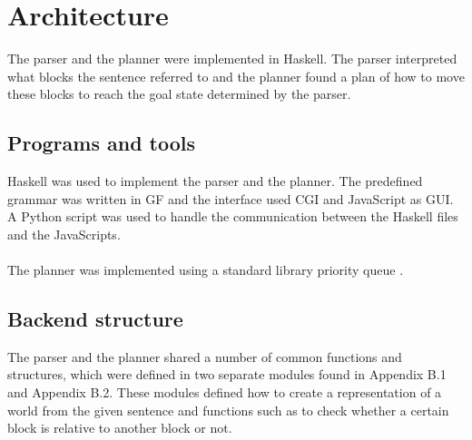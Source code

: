 \chapter{Architecture}
The parser and the planner were implemented in Haskell. The parser interpreted
what blocks the sentence referred to and the planner found a plan of how to
move these blocks to reach the goal state determined by the parser. 

\section{Programs and tools}
Haskell was used to implement the parser and the planner. The predefined grammar was
written in GF and the interface used CGI and JavaScript as GUI. A Python script was
used to handle the communication between the Haskell files and the JavaScripts.
\\\\
The planner was implemented using a standard library priority queue \citep{psq_url}. 

\section{Backend structure}
The parser and the planner shared a number of common functions and structures,
which were defined in two separate modules found in Appendix B.1 and Appendix
B.2. These modules defined how to create a representation of a world from the
given sentence and functions such as to check whether a certain block is
relative to another block or not. 

